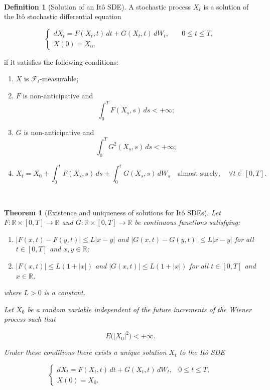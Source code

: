 \documentclass[
  11pt,
  a4paper,
]{book}
\newtheorem{theorem}{Theorem}[chapter]
\theoremstyle{definition}
\newtheorem{definition}{Definition}[chapter]
\theoremstyle{definition}
\theoremstyle{definition}
\theoremstyle{definition}
\theoremstyle{remark}
\begin{document}
\(\,\)

\begin{definition}[Solution of an Itô SDE]

A stochastic process \(X_t\) is a solution of the Itô stochastic differential equation

\[
\label{sol_ito}
\begin{cases}
dX_t = F(X_t, t) \, dt + G(X_t, t) \, dW_t, & \quad 0 \le t \le T,\\[4pt]
X(0) = X_0, &
\end{cases}
\]

if it satisfies the following conditions:

\begin{enumerate}
\def\labelenumi{(\roman{enumi})}
\item
  \(X\) is \(\mathcal{F}_t\)-measurable;
\item
  \(F\) is non-anticipative and
  \[
  \int_{0}^{T} F(X_s, s) \, ds < +\infty;
  \]
\item
  \(G\) is non-anticipative and
  \[
  \int_{0}^{T} G^2(X_s, s) \, ds < +\infty;
  \]
\item
  \[
  X_t = X_0 + \int_{0}^{t} F(X_s, s) \, ds + \int_{0}^{t} G(X_s, s) \, dW_s 
  \quad \text{almost surely}, \quad \forall t \in [0,T].
  \]
\end{enumerate}

\end{definition}

\(\,\)

\begin{theorem}[Existence and uniqueness of solutions for Itô SDEs]
Let \(F:\mathbb{R}\times[0,T]\to\mathbb{R}\) and \(G:\mathbb{R}\times[0,T]\to\mathbb{R}\) be continuous functions satisfying:

\begin{enumerate}
\def\labelenumi{(\roman{enumi})}
\item
  \(|F(x,t) - F(y,t)| \le L|x-y|\) and \(|G(x,t) - G(y,t)| \le L|x-y|\) for all \(t\in[0,T]\) and \(x,y\in\mathbb{R}\);
\item
  \(|F(x,t)| \le L(1+|x|)\) and \(|G(x,t)| \le L(1+|x|)\) for all \(t\in[0,T]\) and \(x\in\mathbb{R}\),
\end{enumerate}

where \(L>0\) is a constant.

Let \(X_0\) be a random variable independent of the future increments of the Wiener process such that

\[
E\big(|X_0|^2\big) < +\infty.
\]

Under these conditions there exists a unique solution \(X_t\) to the Itô SDE

\begin{equation}
\label{eq:sol-ito}
\begin{cases}
dX_t = F(X_t,t)\,dt + G(X_t,t)\,dW_t, & 0 \le t \le T,\\[4pt]
X(0) = X_0.
\end{cases}
\end{equation}
\end{theorem}
\end{document}
